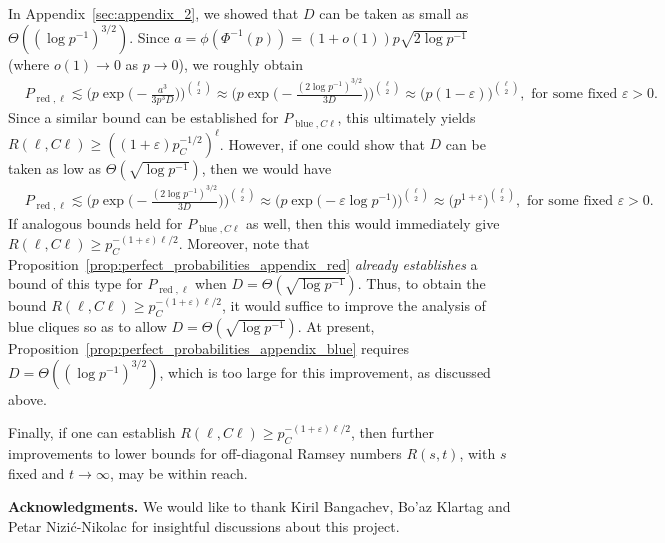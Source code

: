 \documentclass[11pt]{amsart}
\theoremstyle{definition}
\def\eps{\varepsilon}
\DeclareMathOperator{\red}{red}
\DeclareMathOperator{\blue}{blue}
\begin{document}
In Appendix~\ref{sec:appendix_2}, we showed that $D$ can be taken as small as $\Theta((\log p^{-1})^{3/2})$. Since $a=\phi(\Phi^{-1}(p))=(1+o(1))p\sqrt{2\log p^{-1}}$ (where $o(1)\to 0$ as $p\to 0$), we roughly obtain
{\smaller[0.3]
\begin{align*}
&P_{\red, \ell}\lesssim \Big(p\exp\big(-\frac{a^3}{3p^3D}\big)\Big)^{\binom{\ell}{2}}\approx \bigg(p\exp\Big(-\frac{(2\log p^{-1})^{3/2}}{3D}\Big)\bigg)^{\binom{\ell}{2}}\approx \big(p(1-\eps)\big)^{\binom{\ell}{2}}, \text{ for some fixed }\eps>0.
\end{align*}
}\noindent
Since a similar bound can be established for $P_{\blue, C\ell}$, this ultimately yields $R(\ell, C\ell)\geq ((1+\eps)p_C^{-1/2})^{\ell}$. However, if one could show that $D$ can be taken as low as $\Theta(\sqrt{\log p^{-1}})$, then we would have
{\smaller[0.3]
\begin{align*}
&P_{\red, \ell}\lesssim \bigg(p\exp\Big(-\frac{(2\log p^{-1})^{3/2}}{3D}\Big)\bigg)^{\binom{\ell}{2}}\approx \bigg(p\exp\Big(-\eps\log p^{-1}\Big)\bigg)^{\binom{\ell}{2}}\approx \big(p^{1+\eps}\big)^{\binom{\ell}{2}}, \text{ for some fixed }\eps>0.
\end{align*}
}\noindent
If analogous bounds held for $P_{\blue, C\ell}$ as well, then this would immediately give $R(\ell, C\ell)\geq p_C^{-(1+\eps)\ell/2}$. Moreover, note that Proposition~\ref{prop:perfect_probabilities_appendix_red} \textit{already establishes} a bound of this type for $P_{\red, \ell}$ when $D=\Theta(\sqrt{\log p^{-1}})$. Thus, to obtain the bound $R(\ell, C\ell)\geq p_C^{-(1+\eps)\ell/2}$, it would suffice to improve the analysis of blue cliques so as to allow $D=\Theta(\sqrt{\log p^{-1}})$. At present, Proposition~\ref{prop:perfect_probabilities_appendix_blue} requires $D=\Theta((\log p^{-1})^{3/2})$, which is too large for this improvement, as discussed above.

Finally, if one can establish $R(\ell, C\ell)\geq p_C^{-(1+\eps)\ell/2}$, then further improvements to lower bounds for off-diagonal Ramsey numbers $R(s,t)$, with $s$ fixed and $t\to\infty$, may be within reach.

\vspace{0.3cm}
\noindent
{\bf Acknowledgments.} We would like to thank Kiril Bangachev, Bo'az Klartag and Petar Nizi\'c-Nikolac for insightful discussions about this project.
\end{document}
